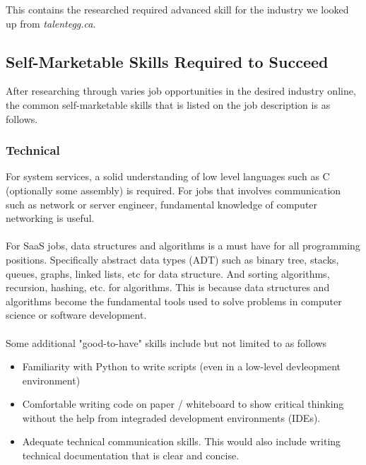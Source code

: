 \documentclass[10pt,letterpaper]{article}
\begin{document}



This contains the researched required advanced skill for the industry we looked up from \textit{talentegg.ca}\cite{talentegg}.

\subsection{Self-Marketable Skills Required to Succeed}

After researching through varies job opportunities in the desired industry online, the common self-marketable skills that is listed on the job description is as follows.

\subsubsection{Technical}

For system services, a solid understanding of low level languages such as C (optionally some assembly) is required. For jobs that involves communication such as network or server engineer, fundamental knowledge of computer networking is useful.\\
\\
For SaaS jobs, data structures and algorithms is a must have for all programming positions. Specifically abstract data types (ADT) such as binary tree, stacks, queues, graphs, linked lists, etc for data structure. And sorting algorithms, recursion, hashing, etc. for algorithms. This is because data structures and algorithms become the fundamental tools used to solve problems in computer science or software development.\\
\\
Some additional "good-to-have" skills include but not limited to as follows
\begin{itemize}
	\item Familiarity with Python to write scripts (even in a low-level devleopment environment)
	\item Comfortable writing code on paper / whiteboard to show critical thinking without the help from integraded development environments (IDEs).
	\item Adequate technical communication skills. This would also include writing technical documentation that is clear and concise.
\end{itemize}
\end{document}
